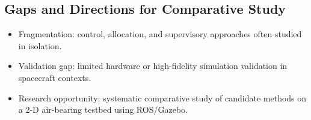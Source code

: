 
\subsection{Gaps and Directions for Comparative Study}
\begin{itemize}
    \item Fragmentation: control, allocation, and supervisory approaches often studied in isolation.
    \item Validation gap: limited hardware or high-fidelity simulation validation in spacecraft contexts.
    \item Research opportunity: systematic comparative study of candidate methods on a 2-D air-bearing testbed using ROS/Gazebo.
\end{itemize}
